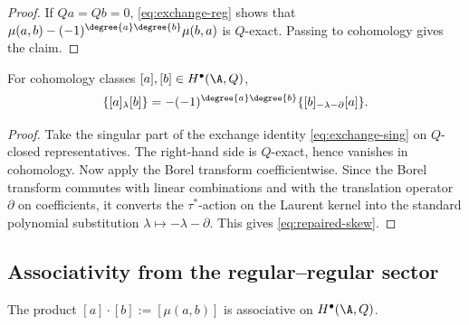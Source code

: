 \begin{proof}
If $Qa=Qb=0$, \eqref{eq:exchange-reg} shows that
$\mu(a,b)-(-1)^{\degree{a}\degree{b}}\mu(b,a)$ is $Q$-exact. Passing to
cohomology gives the claim.
\end{proof}

\begin{proposition}
\label{prop:PVA2_proof}
For cohomology classes $[a],[b]\in H^\bullet(\A,Q)$,
\begin{equation}
\label{eq:repaired-skew}
\{[a]_\lambda [b]\}
=
-(-1)^{\degree{a}\degree{b}}
\{[b]_{-\lambda-\partial}[a]\}.
\end{equation}
\end{proposition}

\begin{proof}
Take the singular part of the exchange identity \eqref{eq:exchange-sing} on
$Q$-closed representatives. The right-hand side is $Q$-exact, hence vanishes in
cohomology. Now apply the Borel transform coefficientwise. Since the Borel transform
commutes with linear combinations and with the translation operator $\partial$ on
coefficients, it converts the $\tau^\ast$-action on the Laurent kernel into the standard
polynomial substitution $\lambda\mapsto-\lambda-\partial$. This gives
\eqref{eq:repaired-skew}.
\end{proof}

\subsection{Associativity from the regular--regular sector}

\begin{proposition}
\label{prop:product-associative}
The product $[a]\cdot[b]:=[\mu(a,b)]$ is associative on $H^\bullet(\A,Q)$.
\end{proposition}

